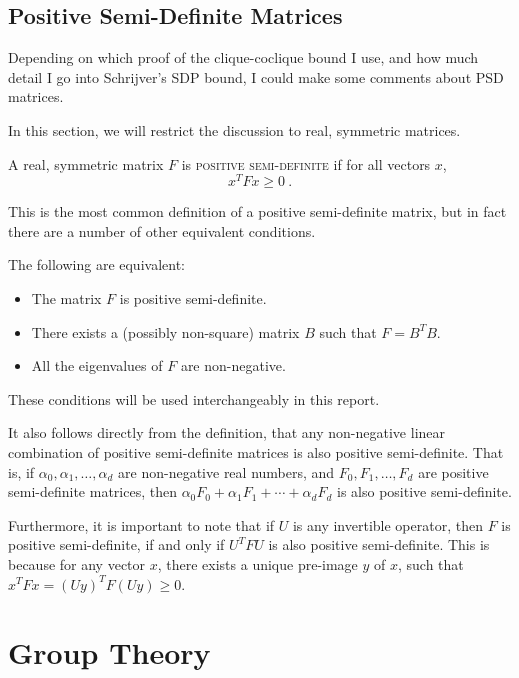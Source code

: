 \documentclass{report}
\begin{document}
  \section{Positive Semi-Definite Matrices}
    Depending on which proof of the clique-coclique bound I use, and how much
    detail I go into Schrijver's SDP bound, I could make some comments about PSD
    matrices.

    In this section, we will restrict the discussion to real, symmetric
    matrices.

    \begin{defn}
      A real, symmetric matrix $F$ is \textsc{positive semi-definite} if for all
      vectors $x$,
      $$
        x^T F x \geq 0 \ .
      $$
    \end{defn}

    This is the most common definition of a positive semi-definite matrix, but
    in fact there are a number of other equivalent conditions.

    \begin{thm}
      The following are equivalent:
      \begin{itemize}
        \item The matrix $F$ is positive semi-definite.
        \item There exists a (possibly non-square) matrix $B$ such that $F = B^T
          B$.
        \item All the eigenvalues of $F$ are non-negative.
      \end{itemize}
    \end{thm}

    These conditions will be used interchangeably in this report.

    It also follows directly from the definition, that any non-negative linear
    combination of positive semi-definite matrices is also positive
    semi-definite.  That is, if $\alpha_0, \alpha_1, \ldots, \alpha_d$ are
    non-negative real numbers, and $F_0, F_1, \ldots, F_d$ are positive
    semi-definite matrices, then $\alpha_0 F_0 + \alpha_1 F_1 + \cdots +
    \alpha_d F_d$ is also positive semi-definite.

    Furthermore, it is important to note that if $U$ is any invertible operator,
    then $F$ is positive semi-definite, if and only if $U^TFU$ is also positive
    semi-definite.  This is because for any vector $x$, there exists a unique
    pre-image $y$ of $x$, such that $x^T F x = (Uy)^T F (Uy) \geq 0$.

\chapter{Group Theory}
\end{document}
